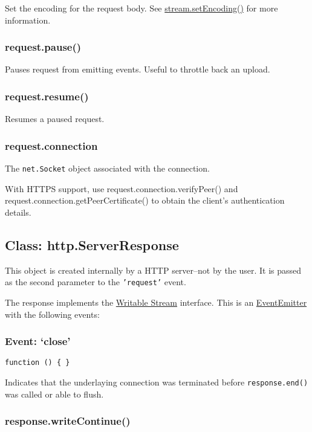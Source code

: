 Set the encoding for the request body. See
\href{stream.html\#stream\_stream\_setencoding\_encoding}{stream.setEncoding()}
for more information.

\subsubsection{request.pause()}

Pauses request from emitting events. Useful to throttle back an upload.

\subsubsection{request.resume()}

Resumes a paused request.

\subsubsection{request.connection}

The \texttt{net.Socket} object associated with the connection.

With HTTPS support, use request.connection.verifyPeer() and
request.connection.getPeerCertificate() to obtain the client's
authentication details.

\subsection{Class: http.ServerResponse}

This object is created internally by a HTTP server--not by the user. It
is passed as the second parameter to the \texttt{'request'} event.

The response implements the
\href{stream.html\#stream\_writable\_stream}{Writable Stream} interface.
This is an
\href{events.html\#events\_class\_events\_eventemitter}{EventEmitter}
with the following events:

\subsubsection{Event: `close'}

\texttt{function () \{ \}}

Indicates that the underlaying connection was terminated before
\texttt{response.end()} was called or able to flush.

\subsubsection{response.writeContinue()}

